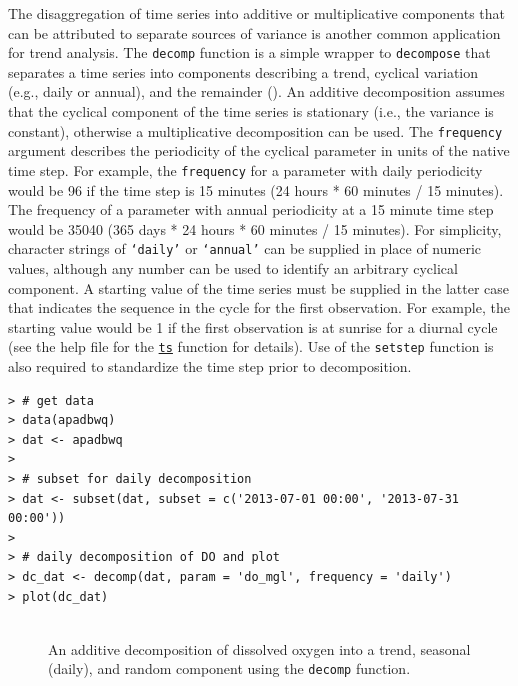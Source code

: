\documentclass[10pt,letterpaper]{article}\usepackage[]{graphicx}\usepackage[]{color}
\makeatletter
\newenvironment{kframe}{%
 \def\at@end@of@kframe{}%
 \ifinner\ifhmode%
  \def\at@end@of@kframe{\end{minipage}}%
  \begin{minipage}{\columnwidth}%
 \fi\fi%
 \def\FrameCommand##1{\hskip\@totalleftmargin \hskip-\fboxsep
 \colorbox{shadecolor}{##1}\hskip-\fboxsep
     \hskip-\linewidth \hskip-\@totalleftmargin \hskip\columnwidth}%
 \MakeFramed {\advance\hsize-\width
   \@totalleftmargin\z@ \linewidth\hsize
   \@setminipage}}%
 {\par\unskip\endMakeFramed%
 \at@end@of@kframe}
\newenvironment{knitrout}{}{} %
\makeatother
\begin{document}
The disaggregation of time series into additive or multiplicative components that can be attributed to separate sources of variance is another common application for trend analysis.  The \texttt{decomp} function is a simple wrapper to \texttt{decompose} \cite{Kendall83} that separates a time series into components describing a trend, cyclical variation (e.g., daily or annual), and the remainder  ().  An additive decomposition assumes that the cyclical component of the time series is stationary (i.e., the variance is constant), otherwise a multiplicative decomposition can be used.  The \texttt{frequency} argument describes the periodicity of the cyclical parameter in units of the native time step.  For example, the \texttt{frequency} for a parameter with daily periodicity would be 96 if the time step is 15 minutes (24 hours * 60 minutes / 15 minutes).  The frequency of a parameter with annual periodicity at a 15 minute time step would be 35040 (365 days * 24 hours * 60 minutes / 15 minutes).  For simplicity, character strings of \texttt{`daily'} or \texttt{`annual'} can be supplied in place of numeric values, although any number can be used to identify an arbitrary cyclical component.  A starting value of the time series must be supplied in the latter case that indicates the sequence in the cycle for the first observation.  For example, the starting value would be 1 if the first observation is at sunrise for a diurnal cycle (see the help file for the \href{https://stat.ethz.ch/R-manual/R-devel/library/stats/html/ts.html}{\texttt{ts}} function for details).  Use of the \texttt{setstep} function is also required to standardize the time step prior to decomposition.

\begin{knitrout}\small
{}\color{fgcolor}\begin{kframe}
\begin{verbatim}
> # get data
> data(apadbwq)
> dat <- apadbwq
> 
> # subset for daily decomposition
> dat <- subset(dat, subset = c('2013-07-01 00:00', '2013-07-31 00:00'))
> 
> # daily decomposition of DO and plot
> dc_dat <- decomp(dat, param = 'do_mgl', frequency = 'daily')
> plot(dc_dat)
\end{verbatim}
\end{kframe}\begin{figure}[!h]

{\centering \includegraphics[width=0.00\textwidth]{figure/decomp_ex1-1} 

}

\caption[An additive decomposition of dissolved oxygen into a trend, seasonal (daily), and random component using the \texttt{decomp} function]{An additive decomposition of dissolved oxygen into a trend, seasonal (daily), and random component using the \texttt{decomp} function.}\label{fig:decomp_ex1}
\end{figure}


\end{knitrout}
\end{document}
